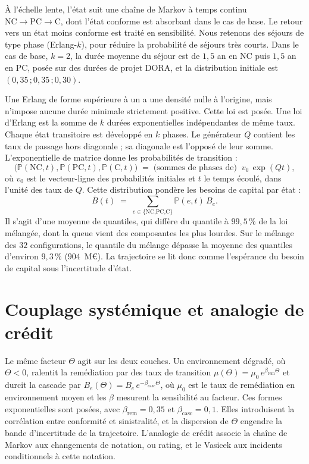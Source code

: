 À l'échelle lente, l'état suit une chaîne de Markov à temps continu
$\text{NC}\to\text{PC}\to\text{C}$, dont l'état conforme est absorbant dans le cas de base. Le
retour vers un état moins conforme est traité en sensibilité. Nous retenons des séjours de type phase (Erlang-$k$), pour réduire la probabilité de séjours très courts. Dans le cas de base, $k=2$, la durée moyenne du séjour est de $1{,}5$ an en NC puis $1{,}5$ an en PC, posée sur des durées de projet DORA, et la distribution initiale est $(0{,}35\,;0{,}35\,;0{,}30)$.

Une Erlang de forme supérieure à un a une densité nulle à l'origine, mais n'impose aucune durée minimale strictement positive. Cette loi est posée. Une loi d'Erlang est la somme de $k$ durées exponentielles indépendantes de même taux. Chaque état transitoire est développé en $k$ phases. Le générateur $Q$ contient les taux de passage hors diagonale ; sa diagonale est l'opposé de leur somme. L'exponentielle de matrice donne les probabilités de transition :
\begin{equation}
\big(\mathbb P(\text{NC},t),\mathbb P(\text{PC},t),\mathbb P(\text{C},t)\big)
\;=\; \text{(sommes de phases de)}\;\; v_0\,\exp(Qt),
\end{equation}
où $v_0$ est le vecteur-ligne des probabilités initiales et $t$ le temps écoulé, dans l'unité des taux de $Q$. Cette distribution pondère les besoins de capital par état :
\begin{equation}
\overline{B}(t)\;=\;\sum_{e\in\{\text{NC,PC,C}\}}\mathbb P(e,t)\,B_e .
\end{equation}
Il s'agit d'une moyenne de quantiles, qui diffère du quantile à $99{,}5\,\%$ de la loi mélangée,
dont la queue vient des composantes les plus lourdes. Sur le mélange des $32$
configurations, le quantile du mélange dépasse la moyenne des quantiles d'environ $9{,}3\,\%$ ($904$~M\euro). La trajectoire se lit donc comme l'espérance du
besoin de capital sous l'incertitude d'état.


\section{Couplage systémique et analogie de crédit}
\label{sec:couplage}

Le même facteur $\Theta$ agit sur les deux couches. Un environnement dégradé, où $\Theta<0$,
ralentit la remédiation par des taux de transition $\mu(\Theta)=\mu_0\,e^{\beta_{\text{rem}}\Theta}$
et durcit la cascade par $B_e(\Theta)=B_e\,e^{-\beta_{\text{casc}}\Theta}$,
où $\mu_0$ est le taux de remédiation en environnement moyen et les $\beta$ mesurent la sensibilité au facteur. Ces formes exponentielles sont posées, avec $\beta_{\text{rem}}=0{,}35$ et $\beta_{\text{casc}}=0{,}1$. Elles introduisent la corrélation entre conformité et
sinistralité, et la dispersion de $\Theta$
engendre la bande d'incertitude de la trajectoire. L'analogie de crédit associe la chaîne de Markov
aux changements de notation, ou rating, et le Vasicek aux incidents conditionnels à cette notation.
